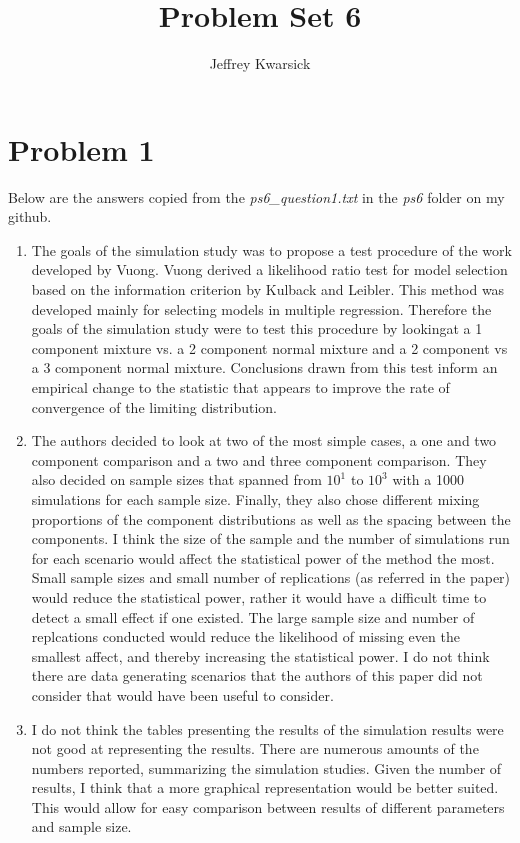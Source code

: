 \documentclass{article}\usepackage[]{graphicx}\usepackage[]{color}
\begin{document}
\title{Problem Set 6}
\author{Jeffrey Kwarsick}
\maketitle
\section{Problem 1}
Below are the answers copied from the \emph{ps6\_question1.txt} in the \emph{ps6} folder on my github.
\begin{enumerate}
  \item The goals of the simulation study was to propose a test procedure of the work developed by Vuong.  Vuong derived a likelihood ratio test for model selection based on the information criterion by Kulback and Leibler.  This method was developed mainly for selecting models in multiple regression.  Therefore the goals of the simulation study were to test this procedure by lookingat a 1 component mixture vs. a 2 component normal mixture and a 2 component vs a 3 component normal mixture. Conclusions drawn from this test inform an empirical change to the statistic that appears to improve the rate of convergence of the limiting distribution.
  \item The authors decided to look at two of the most simple cases, a one and two component comparison and a two and three component comparison. They also decided on sample sizes that spanned from $10^1$ to $10^3$ with a 1000 simulations for each sample size.  Finally, they also chose different mixing proportions of the component distributions as well as the spacing between the components.  I think the size of the sample and the number of simulations run for each scenario would affect the statistical power of the method the most.  Small sample sizes and small number of replications (as referred in the paper) would reduce the statistical power, rather it would have a difficult time to detect a small effect if one existed.  The large sample size and number of replcations conducted would reduce the likelihood of missing even the smallest affect, and thereby increasing the statistical power.  I do not think there are data generating scenarios that the authors of this paper did not consider that would have been useful to consider.
  \item I do not think the tables presenting the results of the simulation results were not good at representing the results.  There are numerous amounts of the numbers reported, summarizing the simulation studies.  Given the number of results, I think that a more graphical representation would be better suited.  This would allow for easy comparison between results of different parameters and sample size.

\end{enumerate}
\end{document}
